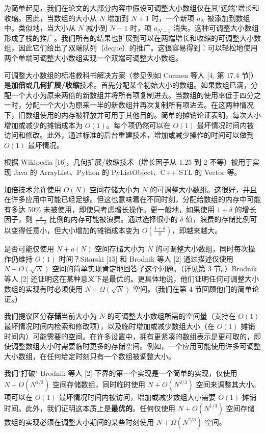 \documentclass[12pt,a4paper]{ctexart}
\theoremstyle{remark}
\begin{document}
为简单起见，我们在论文的大部分内容中假设可调整大小数组仅在其"远端"增长和收缩。因此，当数组的大小从 $N$ 增加到 $N+1$ 时，一个新项 $a_N$ 被添加到数组中。类似地，当大小从 $N$ 减小到 $N-1$ 时，项 $a_{N-1}$ 消失。这种可调整大小数组形成了栈的推广。我们所有的结果也扩展到可以在两端增长和收缩的可调整大小数组，因此它们给出了双端队列（deque）的推广。这很容易得到：可以轻松地使用两个单端可调整大小数组实现一个双端可调整大小数组。

可调整大小数组的标准教科书解决方案（参见例如 Cormen 等人 [4, 第 17.4 节]）是\textbf{加倍}或\textbf{几何扩展/收缩}技术。首先分配某个初始大小的数组。如果数组已满，分配一个大小为原来两倍的新数组并将所有项复制进去。当数组的使用率低于四分之一时，分配一个大小为原来一半的新数组并再次复制所有项进去。在这两种情况下，旧数组使用的内存被释放并可用于其他目的。简单的摊销论证表明，每次大小增加或减少的摊销成本为 $O(1)$。每个项仍然可以在 $O(1)$ 最坏情况时间内被访问和修改。此外，通过标准的后台重建技术，增加或减少操作的时间可以做到 $O(1)$ 最坏情况。

根据 Wikipedia [16]，几何扩展/收缩技术（增长因子从 1.25 到 2 不等）被用于实现 Java 的 ArrayList、Python 的 PyListObject、C++ STL 的 Vector 等。

加倍技术允许使用 $O(N)$ 空间存储大小为 $N$ 的可调整大小数组。这很好，并且在许多应用中可能已经足够。但这也意味着在不同时刻，分配给数组的内存中可能有多达 50\% 未被使用，即使只考虑增长操作。更一般地，如果使用 $1+\delta$ 的增长因子，则 $\frac{\delta}{1+\delta}$ 比例的内存可能被浪费。通过选择很小的 $\delta$ 值，浪费的存储比例可以变得任意小，但大小增加的摊销成本变为 $O(\frac{1+\delta}{\delta})$，即越来越大。

是否可能仅使用 $N+o(N)$ 空间存储大小为 $N$ 的可调整大小数组，同时每次操作仍维持 $O(1)$ 时间？Sitarski [15] 和 Brodnik 等人 [2] 通过描述仅使用 $N+O(\sqrt{N})$ 空间的简单实现肯定地回答了这个问题。（详见第 3 节。）Brodnik 等人 [2] 还证明这在某种意义下是最优的。更具体地说，他们证明任何可调整大小数组的实现有时必须使用 $N+\Omega(\sqrt{N})$ 空间。（我们在第 4 节回顾他们的简单论证。）

我们提议区分\textbf{存储}当前大小为 $N$ 的可调整大小数组所需的空间量（支持在 $O(1)$ 最坏情况时间内检索和修改项），以及临时增加或减少数组大小（在 $O(1)$ 摊销时间内）可能需要的空间。在许多设置中，拥有更紧凑的数组表示是更可取的，即使调整数组大小时需要临时更多的存储空间。例如，一个应用可能使用许多可调整大小数组，在任何给定时刻只有一个数组被调整大小。

我们"打破" Brodnik 等人 [2] 下界的第一个实现是一个简单的实现，仅使用 $N+O(N^{1/3})$ 空间存储数组，同时临时使用 $N+O(N^{2/3})$ 空间来调整其大小。项可以在 $O(1)$ 最坏情况时间内被访问，增加或减少数组大小需要 $O(1)$ 摊销时间。此外，我们证明这本质上是\textbf{最优的}。任何仅使用 $N+O(N^{1/3})$ 空间存储数组的实现必须在调整大小期间的某些时刻使用 $N+\Omega(N^{2/3})$ 空间。
\end{document}
